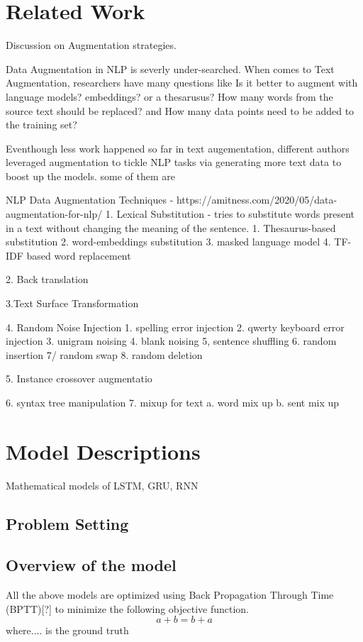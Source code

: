 \documentclass{article}
\begin{document}
\section{Related Work}
Discussion on Augmentation strategies.

Data Augmentation in NLP is severly under-searched. When comes to Text Augmentation, researchers have many questions like Is it better to augment with language models? embeddings? or a thesarusus? How many words from the source text should be replaced? and How many data points need to be added to the training set?

Eventhough less work happened so far in text augementation, different authors leveraged augmentation to tickle NLP tasks via generating more text data to boost up the models.
some of them are 




NLP Data Augmentation Techniques - https://amitness.com/2020/05/data-augmentation-for-nlp/
1. Lexical Substitution - tries to substitute words present in a text without changing the meaning of the sentence.
1. Thesaurus-based substitution
2. word-embeddings substitution
3. masked language model
4. TF-IDF based word replacement

2. Back translation

3.Text Surface Transformation

4. Random Noise Injection
1. spelling error injection
2. qwerty keyboard error injection
3. unigram noising
4. blank noising
5, sentence shuffling
6. random insertion
7/ random swap
8. random deletion


5. Instance crossover augmentatio

6. syntax tree manipulation
7. mixup for text
a. word mix up
b. sent mix up

\section{Model Descriptions}
Mathematical models of LSTM, GRU, RNN
\subsection{Problem Setting}
\subsection{Overview of the model}
All the above models are optimized using Back Propagation Through Time (BPTT)[?] to minimize the following objective function.
\begin{equation}
a + b = b +a
\end{equation}
where.... is the ground truth
\end{document}
